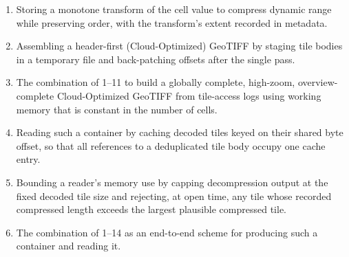 \documentclass[10pt,twocolumn]{article}
\begin{document}
\begin{enumerate}
  the container's structural metadata.
\item Storing a monotone transform of the cell value to compress dynamic range
  while preserving order, with the transform's extent recorded in metadata.
\item Assembling a header-first (Cloud-Optimized) GeoTIFF by staging tile
  bodies in a temporary file and back-patching offsets after the single pass.
\item The combination of 1--11 to build a globally complete, high-zoom,
  overview-complete Cloud-Optimized GeoTIFF from tile-access logs using working
  memory that is constant in the number of cells.
\item Reading such a container by caching decoded tiles keyed on their shared
  byte offset, so that all references to a deduplicated tile body occupy one
  cache entry.
\item Bounding a reader's memory use by capping decompression output at the
  fixed decoded tile size and rejecting, at open time, any tile whose recorded
  compressed length exceeds the largest plausible compressed tile.
\item The combination of 1--14 as an end-to-end scheme for producing such a
  container and reading it.
\end{enumerate}
\end{document}
